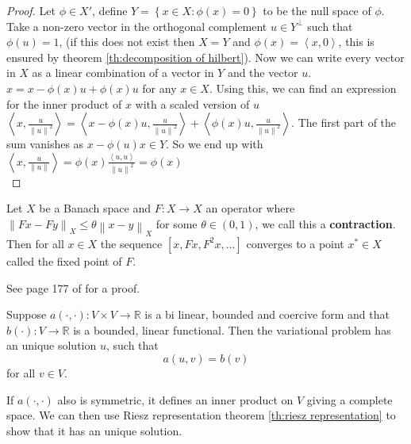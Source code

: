 \documentclass[../Main/main.tex]{subfiles}
\begin{document}
	\begin{proof}
		Let $\phi \in X'$, define $Y = \left \{ x\in X:\phi (x)=0 \right \}$ to be the null space of $\phi$. Take a non-zero vector in the orthogonal complement $u\in Y^{\bot}$ such that $\phi (u)=1$, (if this does not exist then $X=Y$ and $\phi (x) = \left \langle x, 0\right \rangle$, this is ensured by theorem \ref{th:decomposition of hilbert}). Now we can write every vector in $X$ as a linear combination of a vector in $Y$ and the vector $u$. $x = x-\phi (x) u + \phi(x) u$ for any $x \in X$. Using this, we can find an expression for the inner product of $x$ with a scaled version of $u$ \\
		$\left \langle x,\frac{u}{\left \| u \right \|^2} \right \rangle  = \left \langle x-\phi (x)u,\frac{u}{\left \| u \right \|^2} \right \rangle + \left \langle \phi (x)u,\frac{u}{\left \| u \right \|^2} \right \rangle $.
		The first part of the sum vanishes as $x - \phi (u)x \in Y$. So we end up with \\
		$\left \langle x,\frac{u}{\left \| u \right \|} \right \rangle  = \phi (x)\frac{\left \langle u,u\right \rangle}{\left \| u \right \|^2} = \phi (x)$ \\
	\end{proof}
	\begin{theorem}\label{th:Banach}
		Let $X$ be a Banach space and $F:X\rightarrow X$ an operator where $\left \|Fx-Fy\right \|_X\leq \theta \left \| x-y \right\|_X$ for some $\theta \in (0,1)$, we call this a \textbf{contraction}.\\
		Then for all $x \in X$ the sequence $[x,Fx,F^2x,...]$ converges to a point $x^* \in X$ called the fixed point of $F$.
	\end{theorem}
	See page 177 of \cite{Cheney} for a proof.
	\begin{theorem}\label{th:lax milgram}
		Suppose $a(\cdot,\cdot):V \times V \rightarrow \mathbb{R}$ is a bi linear, bounded and coercive form and that $b(\cdot): V \rightarrow \mathbb{R}$ is a bounded, linear functional. Then the variational problem has an unique solution $u$, such that
		\begin{equation}\label{eq:lax milgram}
			a(u,v)=b(v)
		\end{equation}
		for all $v \in V$.
	\end{theorem}
	\begin{remark}
		If $a(\cdot,\cdot)$ also is symmetric, it defines an inner product on $V$ giving a complete space. We can then use Riesz representation theorem \ref{th:riesz representation} to show that it has an unique solution.
	\end{remark}
\end{document}
